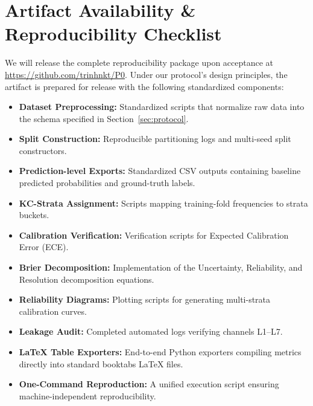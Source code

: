 \documentclass[conference]{IEEEtran}
\begin{document}







\section*{Artifact Availability \& Reproducibility Checklist}
We will release the complete reproducibility package upon acceptance at \url{https://github.com/trinhnkt/P0}. Under our protocol's design principles, the artifact is prepared for release with the following standardized components:
\begin{itemize}
    \item \textbf{Dataset Preprocessing:} Standardized scripts that normalize raw data into the schema specified in Section~\ref{sec:protocol}.
    \item \textbf{Split Construction:} Reproducible partitioning logs and multi-seed split constructors.
    \item \textbf{Prediction-level Exports:} Standardized CSV outputs containing baseline predicted probabilities and ground-truth labels.
    \item \textbf{KC-Strata Assignment:} Scripts mapping training-fold frequencies to strata buckets.
    \item \textbf{Calibration Verification:} Verification scripts for Expected Calibration Error (ECE).
    \item \textbf{Brier Decomposition:} Implementation of the Uncertainty, Reliability, and Resolution decomposition equations.
    \item \textbf{Reliability Diagrams:} Plotting scripts for generating multi-strata calibration curves.
    \item \textbf{Leakage Audit:} Completed automated logs verifying channels L1--L7.
    \item \textbf{LaTeX Table Exporters:} End-to-end Python exporters compiling metrics directly into standard booktabs LaTeX files.
    \item \textbf{One-Command Reproduction:} A unified execution script ensuring machine-independent reproducibility.
\end{itemize}

\appendices




\end{document}
